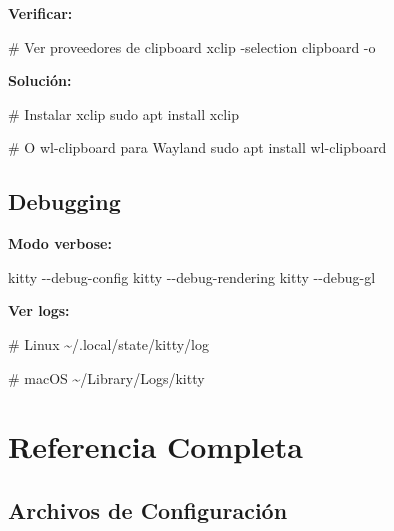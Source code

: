 \documentclass[
  doc,
  floatsintext,
  longtable,
  a4paper,
  nolmodern,
  notxfonts,
  notimes,
  12pt,
  colorlinks=true,linkcolor=blue,citecolor=blue,urlcolor=blue]{apa7}
\newenvironment{Shaded}{\begin{snugshade}}{\end{snugshade}}
\newcommand{\AttributeTok}[1]{\textcolor[rgb]{0.40,0.45,0.13}{#1}}
\newcommand{\CommentTok}[1]{\textcolor[rgb]{0.37,0.37,0.37}{#1}}
\newcommand{\ExtensionTok}[1]{\textcolor[rgb]{0.00,0.23,0.31}{#1}}
\newcommand{\FunctionTok}[1]{\textcolor[rgb]{0.28,0.35,0.67}{#1}}
\newcommand{\NormalTok}[1]{\textcolor[rgb]{0.00,0.23,0.31}{#1}}
\begin{document}
\textbf{Verificar:}

\begin{Shaded}
\begin{Highlighting}[]
\CommentTok{\# Ver proveedores de clipboard}
\ExtensionTok{xclip} \AttributeTok{{-}selection}\NormalTok{ clipboard }\AttributeTok{{-}o}
\end{Highlighting}
\end{Shaded}

\textbf{Solución:}

\begin{Shaded}
\begin{Highlighting}[]
\CommentTok{\# Instalar xclip}
\FunctionTok{sudo}\NormalTok{ apt install xclip}

\CommentTok{\# O wl{-}clipboard para Wayland}
\FunctionTok{sudo}\NormalTok{ apt install wl{-}clipboard}
\end{Highlighting}
\end{Shaded}

\subsection{Debugging}\label{debugging}

\textbf{Modo verbose:}

\begin{Shaded}
\begin{Highlighting}[]
\ExtensionTok{kitty} \AttributeTok{{-}{-}debug{-}config}
\ExtensionTok{kitty} \AttributeTok{{-}{-}debug{-}rendering}
\ExtensionTok{kitty} \AttributeTok{{-}{-}debug{-}gl}
\end{Highlighting}
\end{Shaded}

\textbf{Ver logs:}

\begin{Shaded}
\begin{Highlighting}[]
\CommentTok{\# Linux}
\ExtensionTok{\textasciitilde{}/.local/state/kitty/log}

\CommentTok{\# macOS}
\ExtensionTok{\textasciitilde{}/Library/Logs/kitty}
\end{Highlighting}
\end{Shaded}

\section{Referencia Completa}\label{referencia-completa}

\subsection{Archivos de
Configuración}\label{archivos-de-configuraciuxf3n}
\end{document}
